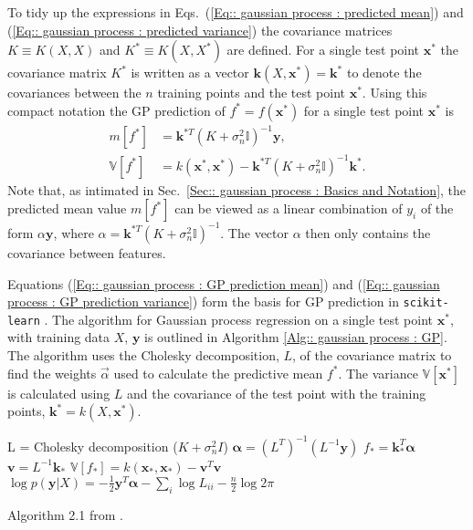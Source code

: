\documentclass[twoside,english]{uiofysmaster}
\begin{document}
{{To tidy up the expressions in Eqs.~(\ref{Eq:: gaussian process : predicted mean}) and (\ref{Eq:: gaussian process : predicted variance}) the covariance matrices $K\equiv K(X, X)$ and $K^* \equiv K(X, X^*)$ are defined. For a single test point $\textbf{x}^*$ the covariance matrix $K^*$ is written as a vector $\textbf{k}(X, \textbf{x}^*) = \textbf{k}^*$ to denote the covariances between the $n$ training points and the test point $\textbf{x}^*$. Using this compact notation the GP prediction of $f^*=f(\textbf{x}^*)$ for a single test point $\textbf{x}^*$ is
\begin{align}
m[f^*] &= \textbf{k}^{*T}(K + \sigma_n^2\mathbb{I})^{-1} \textbf{y},\label{Eq:: gaussian process : GP prediction mean}\\
\mathbb{V}[f^*] &= k(\textbf{x}^*, \textbf{x}^*) - \textbf{k}^{*T}(K + \sigma_n^2 \mathbb{I})^{-1} \textbf{k}^*\label{Eq:: gaussian process : GP prediction variance}.
\end{align}
Note that, as intimated in Sec.~\ref{Sec:: gaussian process : Basics and Notation}, the predicted mean value $m[f^*]$ can be viewed as a linear combination of $y_i$ of the form $\alpha \textbf{y}$, where $\alpha = \textbf{k}^{*T}(K + \sigma_n^2\mathbb{I})^{-1}$. The vector $\alpha$ then only contains the covariance between features.

Equations (\ref{Eq:: gaussian process : GP prediction mean}) and (\ref{Eq:: gaussian process : GP prediction variance}) form the basis for GP prediction in \verb|scikit-learn|  \cite{scikit-learn}. The algorithm for Gaussian process regression on a single test point $\textbf{x}^*$, with training data $X$, $\textbf{y}$ is outlined in Algorithm \ref{Alg:: gaussian process : GP}. The algorithm uses the Cholesky decomposition, $L$, of the covariance matrix to find the weights $\vec{\alpha}$ used to calculate the predictive mean $f^*$. The variance $\mathbb{V}[\textbf{x}^*]$ is calculated using $L$ and the covariance of the test point with the training points, $\textbf{k}^* = k(X, \textbf{x}^*)$.

\begin{algorithm}
L = Cholesky decomposition ($K + \sigma_n^2 I$) \;
$\boldsymbol{\alpha} = (L^T)^{-1}(L^{-1} \textbf{y})$ \;
$f_* = \textbf{k}_*^T \boldsymbol{\alpha}$ \;
$\textbf{v} = L^{-1} \textbf{k}_*$ \;
$\mathbb{V}[f_*] = k(\textbf{x}_*, \textbf{x}_*) - \textbf{v}^T \textbf{v}$ \;
$\log p(\textbf{y}|X) = - \frac{1}{2} \textbf{y}^T \boldsymbol{\alpha} - \sum_i \log L_{ii} - \frac{n}{2} \log 2 \pi$ \;
\caption{Algorithm 2.1 from \cite{rasmussen2006gaussian}.}
\label{Alg:: gaussian process : GP}
\end{algorithm}




}}
\end{document}
